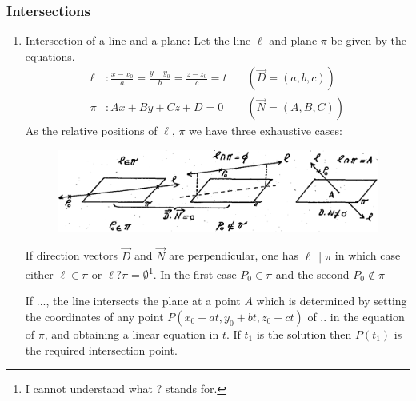 \documentclass[11pt]{amsbook}
\begin{document}
\subsubsection{Intersections}
\begin{enumerate}
	\item \underline{Intersection of a line and a plane:} Let the line $\ell$ and plane $\pi$ be given by the equations.
	\begin{align*}
		\ell &: \frac{x-x_{0}}{a} = \frac{y-y_{0}}{b} = \frac{z-z_{0}}{c} = t \quad &(\vec{D} = (a, b, c)) \\
		\pi &: Ax + By + Cz + D = 0 \quad &(\vec{N} = (A, B, C))
	\end{align*}
	As the relative positions of $\ell$, $\pi$ we have three exhaustive cases:
	\begin{figure}[htbp]
		\begin{center}
			\includegraphics[width=0.8\columnwidth]{images/b2p1-174-fig01.png}
		\end{center}
	\end{figure}
	\par If direction vectors $\vec{D}$ and $\vec{N}$ are perpendicular, one has $\ell\parallel\pi$ in which case either $\ell\in\pi$ or $\ell ? \pi = \emptyset$\footnote{I cannot understand what ? stands for.}. In the first case $P_{0}\in\pi$ and the second $P_{0}\not\in\pi$
	\par If $...$, the line intersects the plane at a point $A$ which is determined by setting the coordinates of any point $P(x_{0} + at, y_{0} + bt, z_{0} + ct)$ of $..$ in the equation of $\pi$, and obtaining a linear equation in $t$. If $t_{1}$ is the solution then $P(t_{1})$ is the required intersection point.
\end{enumerate}
\end{document}
